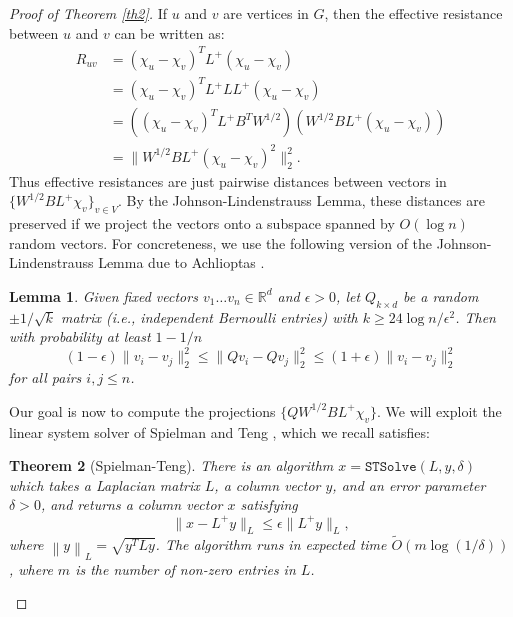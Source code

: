 \documentclass[11pt]{article}
\newtheorem{lem}{Lemma}
\newtheorem{thm}[lem]{Theorem}
\newcommand{\cross}{+}
\newcommand{\Otilde}{\widetilde{O}}
\newcommand{\R}{\mathbb{R}}
\def\norm#1{\left\| #1 \right\|}
\begin{document}
\begin{proof}[Proof of Theorem \ref{th2}] If $u$ and $v$ are vertices in $G$, then the effective resistance between
$u$ and $v$ can be written as:
\begin{align*}
R_{uv}&=(\chi_u-\chi_v)^TL^\cross (\chi_u-\chi_v)\\
&=(\chi_u-\chi_v)^TL^\cross L L^\cross (\chi_u-\chi_v)\\
&=((\chi_u-\chi_v)^TL^\cross B^TW^{1/2})(W^{1/2}B L^\cross (\chi_u-\chi_v))\\
&=\|W^{1/2}BL^\cross (\chi_u-\chi_v)^2\|_2^2.\end{align*}
Thus effective resistances are just pairwise distances between vectors in
$\{W^{1/2}BL^\cross \chi_v\}_{v\in V}$. By the Johnson-Lindenstrauss Lemma, these
distances are preserved if we project the vectors onto a subspace spanned by
$O(\log n)$ random vectors.
For concreteness, we use the following version of the Johnson-Lindenstrauss Lemma
  due to Achlioptas \cite{ach}.
\begin{lem} Given fixed vectors $v_1\ldots v_n\in \R^d$ and
$\epsilon>0$, let
$Q_{k\times d}$ be a random $\pm 1/\sqrt{k}$ matrix (i.e., independent Bernoulli entries)
with $k\ge 24\log n/\epsilon^2$. Then with probability at least $1-1/n$
\[(1-\epsilon)\|v_i-v_j\|_2^2\le \|Qv_i-Qv_j\|_2^2\le
(1+\epsilon)\|v_i-v_j\|_2^2\] for all pairs $i,j\le n$.
\end{lem}

Our goal is now to compute the projections
$\{QW^{1/2}BL^\cross\chi_v\}$.
We will exploit the linear system solver of Spielman and Teng \cite{st04,st06},
which we recall satisfies:

\begin{thm}[Spielman-Teng]\label{st}
There is an algorithm $x = \mathtt{STSolve}(L,y,\delta)$ which
takes a Laplacian matrix $L$, 
a column vector $y$, and an error
parameter $\delta > 0$, and returns a column vector $x$ satisfying
\[
\|x - L^{\cross} y\|_{L} \leq \epsilon \|L^{\cross} y\|_{L},
\] 
where $\norm{y}_{L} = \sqrt{y^{T} L y}$.
The algorithm runs in expected time $\Otilde \left(m \log(1/\delta) \right)$,
where $m$ is the number of non-zero entries in $L$.
\end{thm}


\end{proof}
\end{document}
